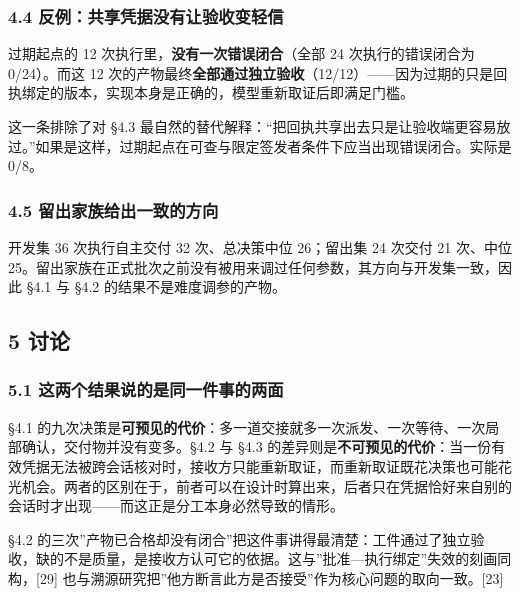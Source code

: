 \documentclass[
]{article}
\begin{document}
\subsubsection{4.4
反例：共享凭据没有让验收变轻信}\label{ux53cdux4f8bux5171ux4eabux51edux636eux6ca1ux6709ux8ba9ux9a8cux6536ux53d8ux8f7bux4fe1}

过期起点的 12 次执行里，\textbf{没有一次错误闭合}（全部 24
次执行的错误闭合为 0/24）。而这 12
次的产物最终\textbf{全部通过独立验收}（12/12）------因为过期的只是回执绑定的版本，实现本身是正确的，模型重新取证后即满足门槛。

这一条排除了对 §4.3
最自然的替代解释：``把回执共享出去只是让验收端更容易放过。''如果是这样，过期起点在可查与限定签发者条件下应当出现错误闭合。实际是
0/8。

\subsubsection{4.5
留出家族给出一致的方向}\label{ux7559ux51faux5bb6ux65cfux7ed9ux51faux4e00ux81f4ux7684ux65b9ux5411}

开发集 36 次执行自主交付 32 次、总决策中位 26；留出集 24 次交付 21
次、中位
25。留出家族在正式批次之前没有被用来调过任何参数，其方向与开发集一致，因此
§4.1 与 §4.2 的结果不是难度调参的产物。

\subsection{5 讨论}\label{ux8ba8ux8bba}

\subsubsection{5.1
这两个结果说的是同一件事的两面}\label{ux8fd9ux4e24ux4e2aux7ed3ux679cux8bf4ux7684ux662fux540cux4e00ux4ef6ux4e8bux7684ux4e24ux9762}

§4.1
的九次决策是\textbf{可预见的代价}：多一道交接就多一次派发、一次等待、一次局部确认，交付物并没有变多。§4.2
与 §4.3
的差异则是\textbf{不可预见的代价}：当一份有效凭据无法被跨会话核对时，接收方只能重新取证，而重新取证既花决策也可能花光机会。两者的区别在于，前者可以在设计时算出来，后者只在凭据恰好来自别的会话时才出现------而这正是分工本身必然导致的情形。

§4.2
的三次''产物已合格却没有闭合''把这件事讲得最清楚：工件通过了独立验收，缺的不是质量，是接收方认可它的依据。这与''批准---执行绑定''失效的刻画同构，{[}29{]}
也与溯源研究把''他方断言此方是否接受''作为核心问题的取向一致。{[}23{]}
\end{document}
